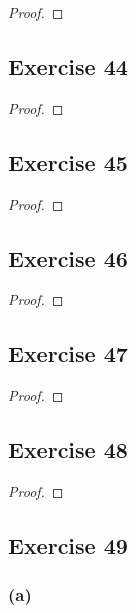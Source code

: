 \documentclass[14pt]{extarticle}
\begin{document}
\begin{proof}

\end{proof}

\subsection{Exercise 44}

\begin{proof}

\end{proof}

\subsection{Exercise 45}

\begin{proof}

\end{proof}

\subsection{Exercise 46}

\begin{proof}

\end{proof}

\subsection{Exercise 47}

\begin{proof}

\end{proof}

\subsection{Exercise 48}

\begin{proof}

\end{proof}

\subsection{Exercise 49}

\subsubsection{(a)}
\end{document}
